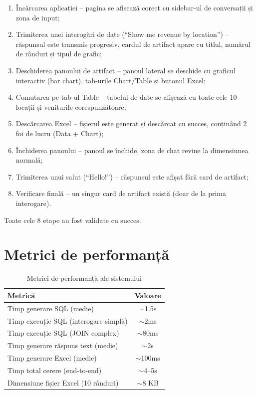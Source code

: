 \documentclass[12pt, a4paper]{report}
\begin{document}
\begin{enumerate}[nosep]
  \item Încărcarea aplicației -- pagina se afișează corect cu sidebar-ul de conversații și zona de input;
  \item Trimiterea unei interogări de date (``Show me revenue by location'') -- răspunsul este transmis progresiv, cardul de artifact apare cu titlul, numărul de rânduri și tipul de grafic;
  \item Deschiderea panoului de artifact -- panoul lateral se deschide cu graficul interactiv (bar chart), tab-urile Chart/Table și butonul Excel;
  \item Comutarea pe tab-ul Table -- tabelul de date se afișează cu toate cele 10 locații și veniturile corespunzătoare;
  \item Descărcarea Excel -- fișierul este generat și descărcat cu succes, conținând 2 foi de lucru (Data + Chart);
  \item Închiderea panoului -- panoul se închide, zona de chat revine la dimensiunea normală;
  \item Trimiterea unui salut (``Hello!'') -- răspunsul este afișat fără card de artifact;
  \item Verificare finală -- un singur card de artifact există (doar de la prima interogare).
\end{enumerate}

Toate cele 8 etape au fost validate cu succes.

\section{Metrici de performanță}

\begin{table}[H]
\centering
\caption{Metrici de performanță ale sistemului}
\label{tab:performanta}
\begin{tabular}{l c}
\toprule
\textbf{Metrică} & \textbf{Valoare} \\
\midrule
Timp generare SQL (medie) & $\sim$1.5s \\
Timp execuție SQL (interogare simplă) & $\sim$2ms \\
Timp execuție SQL (JOIN complex) & $\sim$80ms \\
Timp generare răspuns text (medie) & $\sim$2s \\
Timp generare Excel (medie) & $\sim$100ms \\
Timp total cerere (end-to-end) & $\sim$4--5s \\
Dimensiune fișier Excel (10 rânduri) & $\sim$8 KB \\
\bottomrule
\end{tabular}
\end{table}
\end{document}
